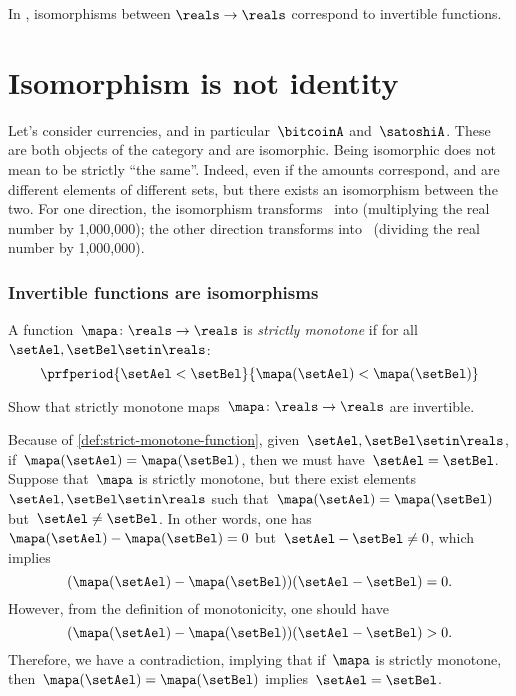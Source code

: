 \begin{example}
    In \Set, isomorphisms between $\reals\to \reals$ correspond to invertible functions.
\end{example}

\section{Isomorphism is not identity}
\begin{example}
    Let's consider currencies, and in particular~$\bitcoinA$ and~$\satoshiA$.
    These are both objects of the category \Curr and are isomorphic.
    Being isomorphic does not mean to be strictly ``the same''.
    Indeed, even if the amounts correspond, \unit[1]{\bitcoinA} and \unit[1,000,000]{\satoshiA} are different elements of different sets, but there exists an isomorphism between the two.
    For one direction, the isomorphism transforms \bitcoinA \ into \satoshiA (multiplying the real number by 1,000,000);
    the other direction transforms \satoshiA into \bitcoinA \ (dividing the real number by 1,000,000).
\end{example}

\subsubsection{Invertible functions are isomorphisms}
\begin{definition}
    \label{def:strict-monotone-function}
    A function~$\mapa\colon \reals \to \reals$ is \emph{strictly monotone} if for all~$\setAel,\setBel\setin \reals$:
    \begin{equation*}
        \prfperiod{\setAel < \setBel}{\mapa(\setAel)<\mapa(\setBel)}
    \end{equation*}
\end{definition}
\begin{exercise}
    Show that strictly monotone maps~$\mapa\colon \reals \to \reals$ are invertible.
\end{exercise}
\begin{solution}
    Because of \cref{def:strict-monotone-function}, given~$\setAel,\setBel\setin \reals$, if~$\mapa(\setAel)=\mapa(\setBel)$, then we must have~$\setAel=\setBel$.
    Suppose that~$\mapa$ is strictly monotone, but there exist elements~$\setAel,\setBel\setin \reals$ such that~$\mapa(\setAel)=\mapa(\setBel)$ but~$\setAel\neq \setBel$.
    In other words, one has~$\mapa(\setAel)-\mapa(\setBel)=0$ but~$\setAel-\setBel\neq 0$, which implies
    \begin{equation*}
        (\mapa(\setAel)-\mapa(\setBel))(\setAel-\setBel)=0.
    \end{equation*}
    However, from the definition of monotonicity, one should have
    \begin{equation*}
        (\mapa(\setAel)-\mapa(\setBel))(\setAel-\setBel)>0.
    \end{equation*}
    Therefore, we have a contradiction, implying that if~$\mapa$ is strictly monotone, then~$\mapa(\setAel)=\mapa(\setBel)$ implies~$\setAel=\setBel$.
\end{solution}

